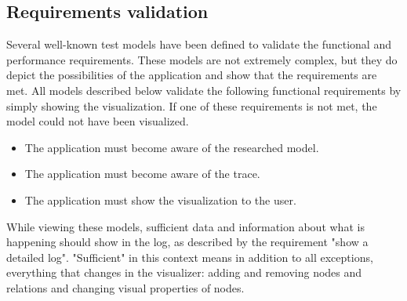 \documentclass[a4paper]{article}
\begin{document}
\subsection{Requirements validation}\label{subsec:requirementsvalidation}
Several well-known test models have been defined to validate the functional and performance requirements. These models are not extremely complex, but they do depict the possibilities of the application and show that the requirements are met. All models described below validate the following functional requirements by simply showing the visualization. If one of these requirements is not met, the model could not have been visualized.
  \begin{itemize}
  \item The application must become aware of the researched model.
  \item The application must become aware of the trace.
  \item The application must show the visualization to the user.
  \end{itemize}
While viewing these models, sufficient data and information about what is happening should show in the log, as described by the requirement "show a detailed log". "Sufficient" in this context means in addition to all exceptions, everything that changes in the visualizer: adding and removing nodes and relations and changing visual properties of nodes.
\end{document}
